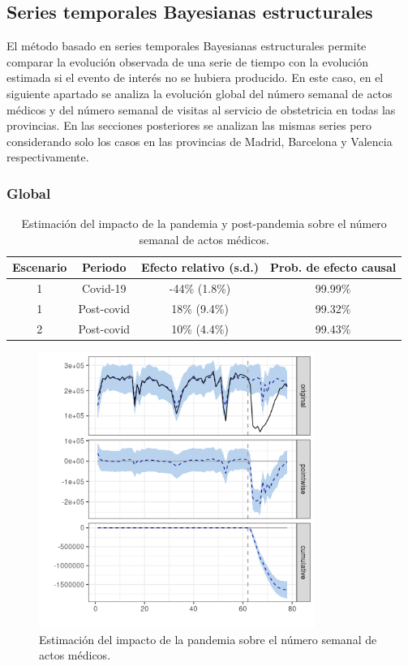 \documentclass[12pt,twoside]{article} %
\begin{document}
\subsection{Series temporales Bayesianas estructurales}
El método basado en series temporales Bayesianas estructurales permite comparar la evolución observada de una serie de tiempo con la evolución estimada si el evento de interés no se hubiera producido. En este caso, en el siguiente apartado se analiza la evolución global del número semanal de actos médicos y del número semanal de visitas al servicio de obstetricia en todas las provincias. En las secciones posteriores se analizan las mismas series pero considerando solo los casos en las provincias de Madrid, Barcelona y Valencia respectivamente.

\subsubsection{Global}\label{global}
\begin{table}[H]\caption{Estimación del impacto de la pandemia y post-pandemia sobre el número semanal de actos médicos.}
    \centering  
      \begin{tabular}{ |c|c|c|c| }
          \hline
          \textbf{Escenario} & \textbf{Periodo} & \textbf{Efecto relativo (s.d.)} & \textbf{Prob. de efecto causal} \\ 
          \hline
       1 & Covid-19 & -44\% (1.8\%) & 99.99\% \\  
       1 & Post-covid & 18\% (9.4\%) & 99.32\% \\
       \hline   
       2 & Post-covid & 10\% (4.4\%) & 99.43\% \\
       \hline
      \end{tabular}
  \end{table}
  
  \begin{center}
      \begin{figure}[H]
        \includegraphics[width=9cm]{global_covid.png}\caption{Estimación del impacto de la pandemia sobre el número semanal de actos médicos.}
      \end{figure}\label{global_covid}
      \end{center}
\end{document}
